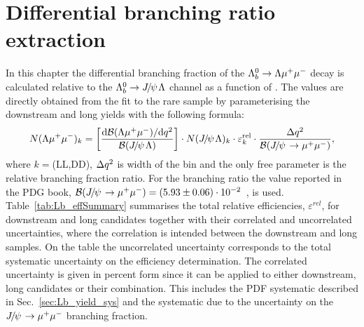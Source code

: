 \section{Differential branching ratio extraction}
\label{sec:Lb_BRsummary}

In this chapter the differential branching fraction of the $\Lambda^0_b\rightarrow\Lambda\mu^+\mu^-$ decay is calculated 
relative to the $\Lb\ra\jpsi\Lz$ channel as a function of \qsq.
The values are directly obtained from the fit to the rare sample by parameterising
the downstream and long yields with the following formula:
%
\begin{equation}
N(\Lz\mumu)_{k}  = \left[ \frac{\mathrm{d}\mathcal{B}(\Lz\mumu)/\mathrm{d}\qsq}{\mathcal{B}(\jpsi\Lz)} \right]  \cdot
N(\jpsi\Lz)_{k} \cdot \varepsilon^{\mathrm{rel}}_{k} \cdot \frac {\Delta\qsq} { \mathcal{B}(\jpsi\to\mumu) },
\label{eq:ield_from_BR}
\end{equation}
\noindent
where $k = $(LL,DD), $\Delta q^2$ is width of the \qsq bin and the only free parameter is the relative
branching fraction ratio. %
For the \jpsi\to\mumu branching ratio the value reported in the PDG book,
$\mathcal{B}(\jpsi\to\mumu) = (5.93 \pm 0.06)\cdot 10^{-2}$~\cite{PDG2014}, is used.
%
Table~\ref{tab:Lb_effSummary} summarises the total relative efficiencies, $\varepsilon^{rel}$, for downstream and long candidates
together with their correlated and uncorrelated uncertainties, where the correlation is intended between the downstream and long 
samples. %
On the table the uncorrelated uncertainty corresponds to the total systematic uncertainty on the efficiency determination.
The correlated uncertainty is given in percent form since it can be applied to either downstream, long candidates 
or their combination. This includes the PDF systematic described in Sec.~\ref{sec:Lb_yield_sys} and the systematic 
due to the uncertainty on the $\jpsi\to\mumu$ branching fraction.

